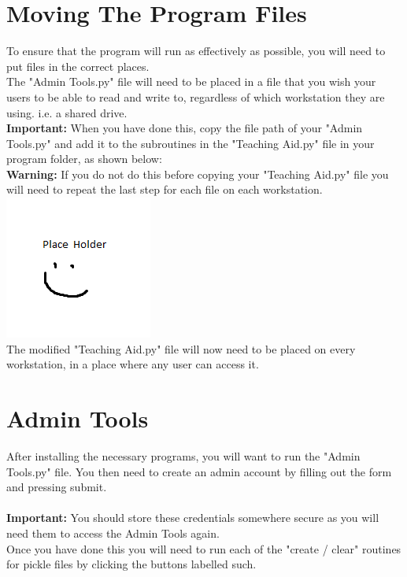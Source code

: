 \documentclass{report}
\begin{document}
\section{Moving The Program Files}
To ensure that the program will run as effectively as possible, you will need to put files in the correct places.\\
The "Admin Tools.py" file will need to be placed in a file that you wish your users to be able to read and write to, regardless of which workstation they are using. i.e. a shared drive.\\ \textbf{Important:} When you have done this, copy the file path of your "Admin Tools.py" and add it to the subroutines in the "Teaching Aid.py" file in your program folder, as shown below:\\
\textbf{Warning: }If you do not do this before copying your "Teaching Aid.py" file you will need to repeat the last step for each file on each workstation.\\
\includegraphics{placeholder}\\

The modified "Teaching Aid.py" file will now need to be placed on every workstation, in a place where any user can access it.
\section{Admin Tools}
After installing the necessary programs, you will want to run the "Admin Tools.py" file. You then need to create an admin account by filling out the form and pressing submit.\\
\\
\textbf{Important: }You should store these credentials somewhere secure as you will need them to access the Admin Tools again.\\
 Once you have done this you will need to run each of the "create / clear" routines for pickle files by clicking the buttons labelled such.\\
 
\end{document}
